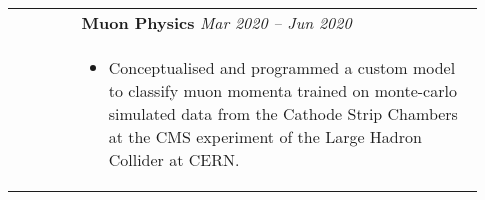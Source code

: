 \documentclass[letterpaper, 10pt, oneside]{article}
\newcommand{\bdit}[1]{{\textbf{#1}}}
\begin{document}
\begin{longtable}{@{} p{0.13\linewidth} p{0.8\linewidth}}

                         & \bdit{Muon Physics} \hfill \textsl{Mar 2020 -- Jun 2020}                                                                                                                  \\
                         & \parbox{0.8\textwidth}{                                                                                                                                                   %
        \begin{itemize}[leftmargin=*, itemsep=-0.88ex, topsep=0.2ex]
            \item Conceptualised and programmed a custom model to classify muon momenta trained on monte-carlo simulated data from the Cathode Strip Chambers at the CMS experiment of the Large Hadron Collider at CERN.
        \end{itemize}
    }                                                                                                                                                                                                \\
    \\[-1.4ex]


\end{longtable}
\end{document}
